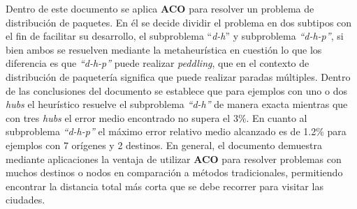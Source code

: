                 \newline
                Dentro de este documento se aplica \textbf{ACO} para resolver un problema de distribución de paquetes. En él se decide dividir el problema en dos subtipos con el fin de facilitar su desarrollo, el subproblema ``\textit{d-h}'' y subproblema \textit{``d-h-p''}, si bien ambos se resuelven mediante la metaheurística en cuestión lo que los diferencia es que \textit{``d-h-p''} puede realizar\textit{ peddling}, que en el contexto de distribución de paquetería significa que puede realizar paradas múltiples.  
                \newline
                \newline
                Dentro de las conclusiones del documento se establece que para ejemplos con uno o dos \textit{hubs} el heurístico resuelve el subproblema \textit{``d-h''} de manera exacta mientras que con tres \textit{hubs} el error medio encontrado no supera el 3\%. En cuanto al subproblema \textit{``d-h-p''} el máximo error relativo medio alcanzado es de 1.2\% para ejemplos con 7 orígenes y 2 destinos.  
                \newline
                \newline
                En general, el documento demuestra mediante aplicaciones la ventaja de utilizar \textbf{ACO} para resolver problemas con muchos destinos o nodos en comparación a métodos tradicionales, permitiendo encontrar la distancia total más corta que se debe recorrer para visitar las ciudades. 
